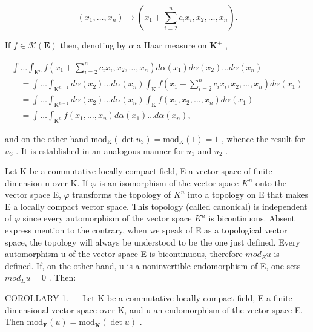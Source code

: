\[
\left(x _ {1}, \dots , x _ {n}\right) \mapsto \left(x _ {1} + \sum_ {i = 2} ^ {n} c _ {i} x _ {i}, x _ {2}, \dots , x _ {n}\right).
\]

If \(f \in \mathcal{K}(\mathbf{E})\) then, denoting by \(\alpha\) a Haar measure on \(\mathbf{K}^+\) ,

\[
\begin{array}{l} \int \dots \int_ {\mathrm{K} ^ {n}} f (x _ {1} + \sum_ {i = 2} ^ {n} c _ {i} x _ {i}, x _ {2}, \ldots , x _ {n}) d \alpha (x _ {1}) d \alpha (x _ {2}) \ldots d \alpha (x _ {n}) \\ \quad = \int \dots \int_ {\mathrm{K} ^ {n - 1}} d \alpha (x _ {2}) \ldots d \alpha (x _ {n}) \int_ {\mathrm{K}} f (x _ {1} + \sum_ {i = 2} ^ {n} c _ {i} x _ {i}, x _ {2}, \ldots , x _ {n}) d \alpha (x _ {1}) \\ \quad = \int \dots \int_ {\mathrm{K} ^ {n - 1}} d \alpha (x _ {2}) \ldots d \alpha (x _ {n}) \int_ {\mathrm{K}} f (x _ {1}, x _ {2}, \ldots , x _ {n}) d \alpha (x _ {1}) \\ \quad = \int \dots \int_ {\mathrm{K} ^ {n}} f (x _ {1}, \ldots , x _ {n}) d \alpha (x _ {1}) \ldots d \alpha (x _ {n}), \end{array}
\]

and on the other hand \(\mathrm{mod}_{\mathrm{K}}(\det u_{3})=\mathrm{mod}_{\mathrm{K}}(1)=1\) , whence the result for \(u_{3}\) . It is established in an analogous manner for \(u_{1}\) and \(u_{2}\) .

Let K be a commutative locally compact field, E a vector space of finite dimension n over K. If \(\varphi\) is an isomorphism of the vector space \(K^{n}\) onto the vector space E, \(\varphi\) transforms the topology of \(K^{n}\) into a topology on E that makes E a locally compact vector space. This topology (called canonical) is independent of \(\varphi\) since every automorphism of the vector space \(K^{n}\) is bicontinuous. Absent express mention to the contrary, when we speak of E as a topological vector space, the topology will always be understood to be the one just defined. Every automorphism u of the vector space E is bicontinuous, therefore \(mod_{E}u\) is defined. If, on the other hand, u is a noninvertible endomorphism of E, one sets \(mod_{E}u = 0\) . Then:

COROLLARY 1. --- Let K be a commutative locally compact field, E a finite-dimensional vector space over K, and u an endomorphism of the vector space E. Then \(\text{mod}_{\mathbf{E}}(u) = \text{mod}_{\mathbf{K}}(\det u)\) .

